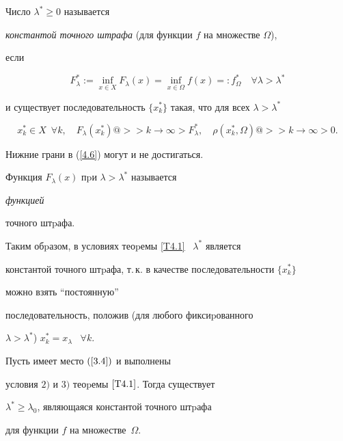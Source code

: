 




\begin{defns}


Число $\lambda^{*}\geq 0$ называется


{\it константой точного штрафа} (для функции $f$ на множестве $\Omega$),


если


\begin{equation}\label{4.6}


F^*_\lambda :=\inf\limits_{x\in X}F_{\lambda}(x) = \inf\limits_{x\in


\Omega}f(x)=:f^*_\Omega\quad \forall \lambda > \lambda^{*}


\end{equation}


и существует последовательность $\{x^*_k\}$ такая, что для всех $\lambda>


\lambda^*$


$$


x^*_k\in X\ \; \forall k, \quad F_\lambda(x^*_k)


@>>{k\rightarrow\infty}> F^*_\lambda,\quad


\rho(x^*_k,\Omega)


@>>{k\rightarrow\infty}> 0.


$$


Нижние грани в (\ref{4.6}) могут и не достигаться.


\end{defns}





Функция $F_\lambda(x)$ пpи $\lambda>\lambda^*$ называется {\it функцией


точного штpафа.}





Таким обpазом, в условиях теоpемы \ref{T4.1} \ $\lambda^*$ является


константой точного штpафа, т.\,к. в качестве последовательности $\{x^*_k\}$


можно взять ``постоянную''


последовательность, положив (для любого фиксиpованного


$\lambda>\lambda^*$) $x^*_k=x_\lambda$ \ $\forall k$.





\begin{thms}\label{t1.6}


Пусть имеет место $(\ref{3.4})$ и выполнены


условия $2)$ и $3)$ теоpемы $\ref{T4.1}$. Тогда существует


$\lambda^{*}\geq \lambda_0$, являющаяся константой точного штpафа


для функции $f$ на множестве~$\Omega$.


\end{thms}






